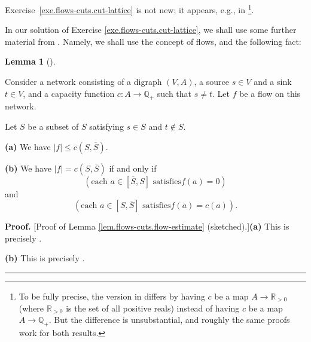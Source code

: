 \documentclass[numbers=enddot,12pt,final,onecolumn,notitlepage]{scrartcl}%
\theoremstyle{definition}
\newtheorem{lem}[theo]{Lemma}
\newenvironment{lemma}[1][]
{\begin{lem}[#1]\begin{leftbar}}
{\end{leftbar}\end{lem}}
\newenvironment{proof}[1][Proof]{\noindent\textbf{#1.} }{\ \rule{0.5em}{0.5em}}
\newcommand{\QQ}{\mathbb{Q}}
\newcommand{\RR}{\mathbb{R}}
\begin{document}
Exercise~\ref{exe.flows-cuts.cut-lattice} is not new;
it appears, e.g., in \cite[Corollary 3]{PicQue80}\footnote{To
  be fully precise, the version in
  \cite[Corollary 3]{PicQue80} differs by having $c$ be
  a map $A \to \RR_{> 0}$ (where $\RR_{> 0}$ is the set of
  all positive reals) instead of having $c$ be a map
  $A \to \QQ_+$. But the difference is unsubstantial,
  and roughly the same proofs work for both results.}.

In our solution of Exercise \ref{exe.flows-cuts.cut-lattice}, we shall use
some further material from
\cite{lec16}. Namely, we shall use the concept of flows, and the following fact:

\begin{lemma}
\label{lem.flows-cuts.flow-estimate}Consider a network consisting of a digraph
$\left(  V,A\right)  $, a source $s\in V$ and a sink $t\in V$, and a capacity
function $c:A\rightarrow\mathbb{Q}_{+}$ such that $s\neq t$. Let $f$ be a flow
on this network.

Let $S$ be a subset of $S$ satisfying $s\in S$ and $t\notin S$.

\textbf{(a)} We have $\left\vert f\right\vert \leq c\left(  S,\overline
{S}\right)  $.

\textbf{(b)} We have $\left\vert f\right\vert =c\left(  S,\overline{S}\right)
$ if and only if%
\begin{equation}
\left(  \text{each }a\in\left[  \overline{S},S\right]  \text{ satisfies
}f\left(  a\right)  =0\right)  \label{eq.lem.flows-cuts.flow-estimate.b.1}%
\end{equation}
and%
\begin{equation}
\left(  \text{each }a\in\left[  S,\overline{S}\right]  \text{ satisfies
}f\left(  a\right)  =c\left(  a\right)  \right)
.\label{eq.lem.flows-cuts.flow-estimate.b.2}%
\end{equation}

\end{lemma}

\begin{proof}
[Proof of Lemma \ref{lem.flows-cuts.flow-estimate} (sketched).]\textbf{(a)}
This is precisely \cite[Proposition 1.7 \textbf{(c)}]{lec16}.

\textbf{(b)} This is precisely \cite[Proposition 1.7 \textbf{(d)}]{lec16}.
\end{proof}
\end{document}
